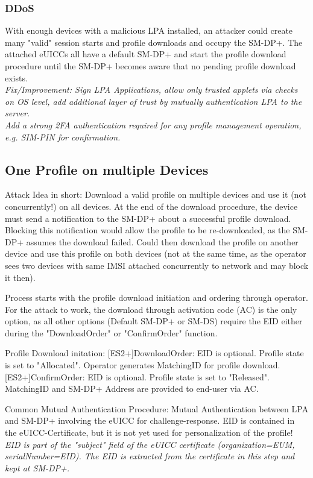 \subsubsection{DDoS}
With enough devices with a malicious LPA installed, an attacker could create many "valid" session starts and profile downloads and occupy the SM-DP+. The attached eUICCs all have a default SM-DP+ and start the profile download procedure until the SM-DP+ becomes aware that no pending profile download exists.
\\
\textit{Fix/Improvement: Sign LPA Applications, allow only trusted applets via checks on OS level, add additional layer of trust by mutually authentication LPA to the server. \\ 
Add a strong 2FA authentication required for any profile management operation, e.g. SIM-PIN for confirmation.}

\subsection{One Profile on multiple Devices}\label{chapter:ProfMultiDevice}
Attack Idea in short: Download a valid profile on multiple devices and use it (not concurrently!) on all devices. At the end of the download procedure, the device must send a notification to the SM-DP+ about a successful profile download. Blocking this notification would allow the profile to be re-downloaded, as the SM-DP+ assumes the download failed. Could then download the profile on another device and use this profile on both devices (not at the same time, as the operator sees two devices with same IMSI attached concurrently to network and may block it then).

Process starts with the profile download initiation and ordering through operator. For the attack to work, the download through activation code (AC) is the only option, as all other options (Default SM-DP+ or SM-DS) require the EID either during the "DownloadOrder" or "ConfirmOrder" function.

Profile Download initation:
[ES2+]DownloadOrder: EID is optional. Profile state is set to "Allocated". Operator generates MatchingID for profile download.
[ES2+]ConfirmOrder: EID is optional. Profile state is set to "Released". MatchingID and SM-DP+ Address are provided to end-user via AC.

Common Mutual Authentication Procedure: Mutual Authentication between LPA and SM-DP+ involving the eUICC for challenge-response. EID is contained in the eUICC-Certificate, but it is not yet used for personalization of the profile! \textit{EID is part of the "subject" field of the eUICC certificate (organization=EUM, serialNumber=EID). The EID is extracted from the certificate in this step and kept at SM-DP+.}

